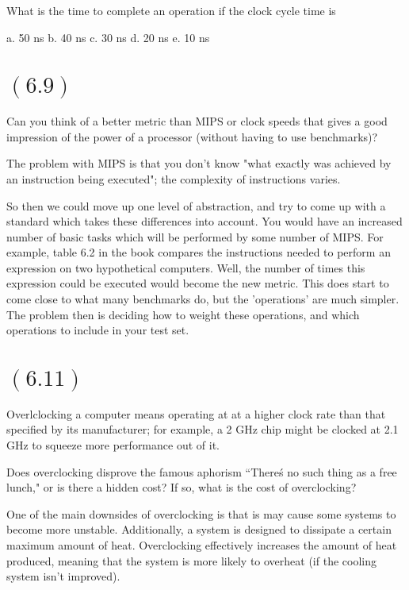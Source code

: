 \documentclass[letterpaper,12pt,titlepage]{article}
\begin{document}
What is the time to complete an operation if the clock cycle time is

a. 50 ns
b. 40 ns
c. 30 ns
d. 20 ns
e. 10 ns

\begin{mdframed}[style=MyFrame]
\end{mdframed}

\section*{$(6.9)$} Can you think of a better metric than MIPS or clock speeds that gives a good impression of the power of a processor (without having to use benchmarks)?
\begin{mdframed}[style=MyFrame]
    The problem with MIPS is that you don't know "what exactly was achieved by an instruction being executed";
    \cite{Clements} the complexity of instructions varies.

    So then we could move up one level of abstraction, and try to come up with a standard which takes these differences into account. You would have an increased number of basic tasks which will be performed by some number of MIPS. For example, table 6.2 in the book compares the instructions needed to perform an expression on two hypothetical computers. Well, the number of times this expression could be executed would become the new metric. This does start to come close to what many benchmarks do, but the 'operations' are much simpler. The problem then is deciding how to weight these operations, and which operations to include in your test set.
\end{mdframed}

\section*{$(6.11)$} Overlclocking a computer means operating at at a higher clock rate than that specified by its manufacturer; for example, a 2 GHz chip might be clocked at 2.1 GHz to squeeze more performance out of it.

Does overclocking disprove the famous aphorism ``There\'s no such thing as a free lunch," or is there a hidden cost? If so, what is the cost of overclocking?

\begin{mdframed}[style=MyFrame]
    One of the main downsides of overclocking is that is may cause some systems to become more unstable. Additionally, a system is designed to dissipate a certain maximum amount of heat. Overclocking effectively increases the amount of heat produced, meaning that the system is more likely to overheat (if the cooling system isn't improved).
\end{mdframed}
\newpage
\end{document}
